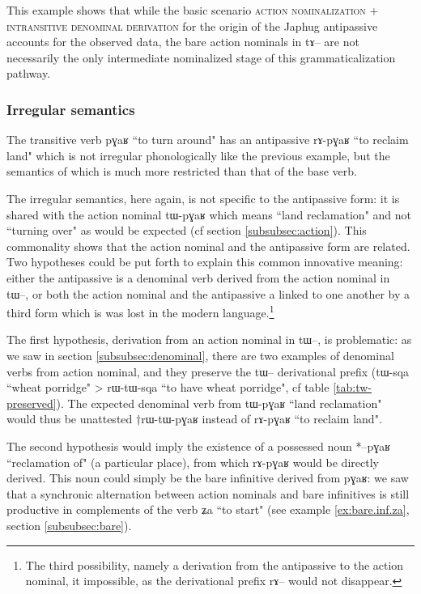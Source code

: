 \documentclass[oldfontcommands,oneside,a4paper,11pt]{article}
\newcommand{\ipa}[1]{{\phon \mbox{#1}}} %
\begin{document}
This example shows that while the basic scenario \textsc{action nominalization} + \textsc{intransitive denominal derivation} for the origin of the Japhug antipassive accounts for the observed data, the bare action nominals in \ipa{tɤ}-- are not necessarily the only intermediate nominalized stage of this grammaticalization pathway.




\subsubsection{Irregular semantics} \label{subsec:sem.irr}
The transitive verb \ipa{pɣaʁ} ``to turn around" has an antipassive \ipa{rɤ-pɣaʁ} ``to reclaim land" which is not irregular phonologically like the previous example, but the semantics of which is much more restricted than that of the base verb. 

The irregular semantics, here again, is not specific to the antipassive form: it is shared with the action nominal \ipa{tɯ-pɣaʁ} which means ``land reclamation" and not ``turning over" as would be expected (cf section \ref{subsubsec:action}). This commonality shows that the action nominal and the antipassive form are related. Two hypotheses could be put forth to explain this common innovative meaning: either the antipassive is a denominal verb derived from the action nominal in \ipa{tɯ}--, or both the action nominal and the antipassive a linked to one another by a third form which is was lost in the modern language.\footnote{The third possibility, namely a derivation from the antipassive to the action nominal, it impossible, as the derivational prefix \ipa{rɤ}-- would not disappear.} 

The first hypothesis, derivation from an action nominal in \ipa{tɯ}--, is problematic: as we saw in section \ref{subsubsec:denominal}, there are two examples of denominal verbs from action nominal, and they preserve the \ipa{tɯ}-- derivational prefix (\ipa{tɯ-sqa} ``wheat porridge" > \ipa{rɯ-tɯ-sqa} ``to have wheat porridge", cf table \ref{tab:tw-preserved}). The expected denominal verb from \ipa{tɯ-pɣaʁ} ``land reclamation" would thus be unattested †\ipa{rɯ-tɯ-pɣaʁ} instead of \ipa{rɤ-pɣaʁ} ``to reclaim land".


The second hypothesis would imply the existence of a possessed noun *\ipa{--pɣaʁ} ``reclamation of" (a particular place), from which \ipa{rɤ-pɣaʁ} would be directly derived. This noun could simply be the bare infinitive derived from \ipa{pɣaʁ}: we saw that a synchronic alternation between action nominals and bare infinitives is still   productive in complements of the verb \ipa{ʑa} ``to start" (see example \ref{ex:bare.inf.za}, section \ref{subsubsec:bare}).
\end{document}
